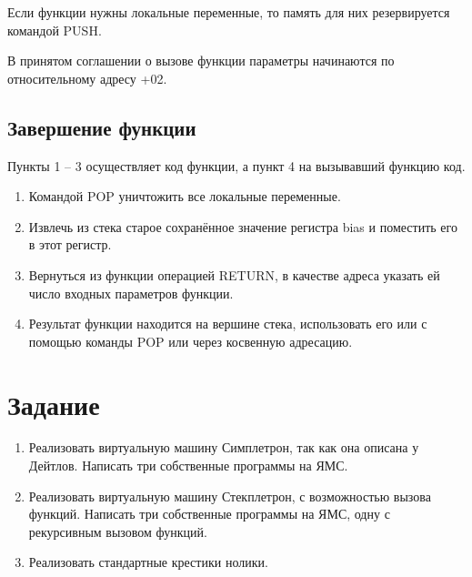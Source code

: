 \documentclass[12pt]{article}
\begin{document}
Если функции нужны локальные переменные, то память для них резервируется командой PUSH.

В принятом соглашении о вызове функции параметры начинаются по относительному адресу +02.

\subsection{Завершение функции}
Пункты 1 -- 3 осуществляет код функции, а пункт 4 на вызывавший функцию код.
\begin{enumerate}
 \item Командой POP уничтожить все локальные переменные.
 \item Извлечь из стека старое сохранённое значение регистра bias и поместить его в этот регистр.
 \item Вернуться из функции операцией RETURN, в качестве адреса указать ей число входных параметров функции.
 \item Результат функции находится на вершине стека, использовать его или с помощью команды POP или через косвенную адресацию.
\end{enumerate}



\section{Задание}

\begin{enumerate}
 \item Реализовать виртуальную машину Симплетрон, так как она описана у Дейтлов. Написать три собственные программы на ЯМС. 
 \item Реализовать виртуальную машину Стекплетрон, с возможностью вызова функций. Написать три собственные программы на ЯМС, одну с рекурсивным вызовом функций. 
 \item Реализовать стандартные крестики нолики.
\end{enumerate}
\end{document}
